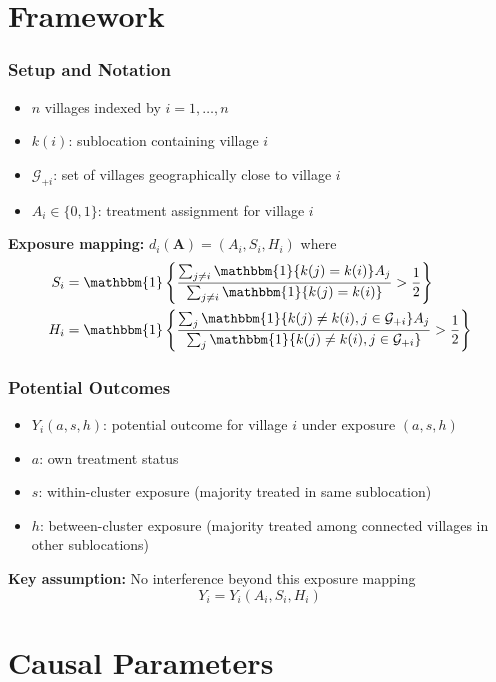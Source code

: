 \documentclass{beamer}
\newcommand{\indicator}{\mathbbm{1}}
\newcommand{\bA}{\boldsymbol{A}}
\newcommand{\cG}{\mathcal{G}}
\begin{document}
\section{Framework}

\begin{frame}
\frametitle{Setup and Notation}
\begin{itemize}
\item $n$ villages indexed by $i = 1, \ldots, n$
\item $k(i)$: sublocation containing village $i$
\item $\cG_{+i}$: set of villages geographically close to village $i$
\item $A_i \in \{0,1\}$: treatment assignment for village $i$
\end{itemize}

\vspace{0.5cm}
\textbf{Exposure mapping:} $d_i(\bA) = (A_i, S_i, H_i)$ where
\begin{align}
S_i &= \indicator\left\{\frac{\sum_{j\neq i}\indicator\{k(j)=k(i)\} A_j}{\sum_{j\neq i}\indicator\{k(j)=k(i)\}} > \frac{1}{2}\right\} \\
H_i &= \indicator\left\{\frac{\sum_j \indicator\{k(j)\neq k(i), j\in\cG_{+i}\}A_j}{\sum_j \indicator\{k(j)\neq k(i), j\in\cG_{+i}\}} > \frac{1}{2}\right\}
\end{align}
\end{frame}

\begin{frame}
\frametitle{Potential Outcomes}
\begin{itemize}
\item $Y_i(a,s,h)$: potential outcome for village $i$ under exposure $(a,s,h)$
\item $a$: own treatment status
\item $s$: within-cluster exposure (majority treated in same sublocation)
\item $h$: between-cluster exposure (majority treated among connected villages in other sublocations)
\end{itemize}

\vspace{0.5cm}
\textbf{Key assumption:} No interference beyond this exposure mapping
$$Y_i = Y_i(A_i, S_i, H_i)$$
\end{frame}

\section{Causal Parameters}
\end{document}
